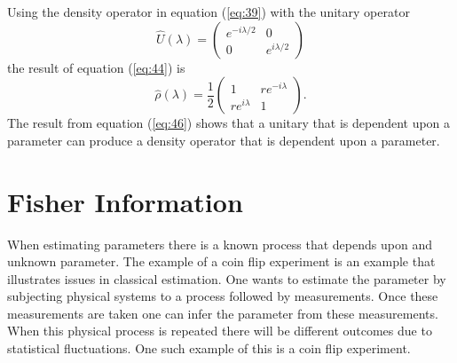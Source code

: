 \documentclass[twocolumn]{article}
\begin{document}
Using the density operator in equation (\ref{eq:39}) with the unitary operator
\begin{equation} \label{eq:45}
\hat{U}(\lambda)=
\begin{pmatrix}
e^{-i\lambda/2} & 0 \\
0 & e^{i\lambda/2}
\end{pmatrix}
\end{equation}
the result of equation (\ref{eq:44}) is
\begin{equation} \label{eq:46}
\hat{\rho}(\lambda)=\frac{1}{2}
\begin{pmatrix}
1 & re^{-i\lambda} \\
re^{i\lambda} & 1
\end{pmatrix}.
\end{equation}
The result from equation (\ref{eq:46}) shows that a unitary that is dependent upon a parameter can produce a density operator that is dependent upon a parameter.
\section*{Fisher Information}
When estimating parameters there is a known process that depends upon and unknown parameter. The example of a coin flip experiment is an example that illustrates issues in classical estimation. One wants to estimate the parameter by subjecting physical systems to a process followed by measurements. Once these measurements are taken one can infer the parameter from these measurements. When this physical process is repeated there will be different outcomes due to statistical fluctuations. One such example of this is a coin flip experiment.
\end{document}
